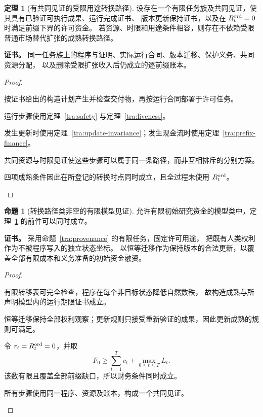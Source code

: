 \documentclass[UTF8,12pt,a4paper,openany,fontset=none,zihao=false]{ctexrep}
\theoremstyle{definition}
\newtheorem{theorem}{定理}[chapter]
\newtheorem{proposition}{命题}[chapter]
\newenvironment{certificate}{\par\noindent\textbf{证书。}\ignorespaces}{\par}
\newcommand{\1}{\mathbf 1}
\begin{document}
\begin{theorem}[有共同见证的受限用途转换路径]
\label{tra:transition-existence}
设存在一个有限任务族及共同见证，使其具有已验证可执行成果、运行完成证书、
版本更新保持证书，以及在 \(R_t^{\rm ord}=0\) 时满足前缀下界的许可资金。
若资源、时限和用途条件相容，则存在不依赖受限普通市场替代扩张的成熟转换路径。
\end{theorem}
\begin{certificate}
同一任务族上的程序与证明、实际运行合同、版本迁移、保护义务、共同资源分配，
以及删除受限扩张收入后仍成立的逐前缀账本。
\end{certificate}
\begin{proof}
\begin{semanticsteps}
\item 按证书给出的构造计划产生并检查交付物，再按运行合同部署于许可任务。
\item 运行步骤使用定理~\ref{tra:safety} 与定理~\ref{tra:liveness}。
\item 发生更新时使用定理~\ref{tra:update-invariance}；发生现金流时使用定理~\ref{tra:prefix-finance}。
\item 共同资源与时限见证使这些步骤可以属于同一条路径，而非互相排斥的分别方案。
\item 四项成熟条件因此在所登记的转换时点同时成立，且全过程未使用 \(R_t^{\rm ord}\)。
\end{semanticsteps}
\end{proof}

\begin{proposition}[转换路径类非空的有限模型见证]
\label{tra:nonempty}
允许有限初始研究资金的模型类中，定理~\ref{tra:transition-existence} 的前件可以同时成立。
\end{proposition}
\begin{certificate}
采用命题~\ref{tra:provenance} 的有限任务，固定许可用途，
把既有人类权利作为不被程序写入的独立状态坐标。
以恒等迁移作为保持版本的合法更新，以覆盖全部有限成本和义务准备的初始资金融资。
\end{certificate}
\begin{proof}
\begin{semanticsteps}
\item 有限转移表可完全检查，程序在每个非目标状态降低自然数秩，
故构造成熟与所声明模型内的运行期限证书成立。
\item 恒等迁移保持全部权利观察；更新规则只接受重新验证的成果，因此更新成熟的规则可满足。
\item 令 \(r_t=R_t^{\rm ord}=0\)，并取
\[
F_0\ge\sum_{t=1}^T c_t+\max_{0\le t\le T}L_t.
\]
该数有限且覆盖全部前缀缺口，所以财务条件同时成立。
\item 所有步骤使用同一程序、资源及账本，构成一个共同见证。
\end{semanticsteps}
\end{proof}
\end{document}
